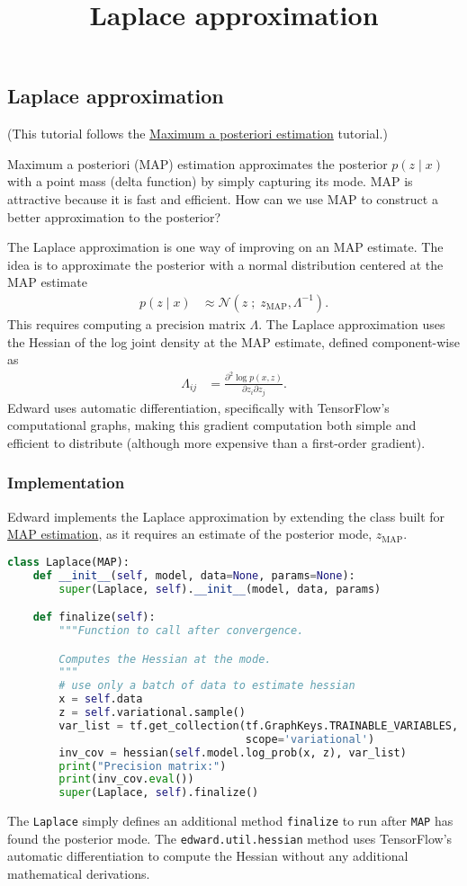 \title{Laplace approximation}

\subsection{Laplace approximation}

(This tutorial follows the
\href{tut_MAP.html}{Maximum a posteriori estimation} tutorial.)

Maximum a posteriori (MAP) estimation approximates the posterior $p(z \mid x)$
with a point mass (delta function) by simply capturing its mode. MAP is
attractive because it is fast and efficient. How can we use MAP to construct a
better approximation to the posterior?

The Laplace approximation is one way of improving on an MAP estimate. The idea
is to approximate the posterior with a normal distribution centered at the MAP
estimate
\begin{align*}
  p(z \mid x)
  &\approx
  \mathcal{N}(z\;;\; z_\text{MAP}, \Lambda^{-1}).
\end{align*}
This requires computing a precision matrix $\Lambda$. The Laplace approximation
uses the Hessian of the log joint density at the MAP estimate,
defined component-wise as
\begin{align*}
  \Lambda_{ij}
  &=
  \frac{\partial^2 \log p(x, z)}{\partial z_i \partial z_j}.
\end{align*}
Edward uses automatic differentiation, specifically with TensorFlow's
computational graphs, making this gradient computation both simple and
efficient to distribute (although more expensive than a first-order
gradient).

\subsubsection{Implementation}

Edward implements the Laplace approximation by extending the class built for
\href{tut_MAP.html}{MAP estimation}, as it requires an estimate of the
posterior mode, $z_\text{MAP}$.

\begin{lstlisting}[language=Python]
class Laplace(MAP):
    def __init__(self, model, data=None, params=None):
        super(Laplace, self).__init__(model, data, params)

    def finalize(self):
        """Function to call after convergence.

        Computes the Hessian at the mode.
        """
        # use only a batch of data to estimate hessian
        x = self.data
        z = self.variational.sample()
        var_list = tf.get_collection(tf.GraphKeys.TRAINABLE_VARIABLES,
                                     scope='variational')
        inv_cov = hessian(self.model.log_prob(x, z), var_list)
        print("Precision matrix:")
        print(inv_cov.eval())
        super(Laplace, self).finalize()
\end{lstlisting}

The \texttt{Laplace} simply defines an additional method \texttt{finalize} to
run after \texttt{MAP} has found the posterior mode. The
\texttt{edward.util.hessian} method uses TensorFlow's automatic differentiation
to compute the Hessian without any additional mathematical derivations.

